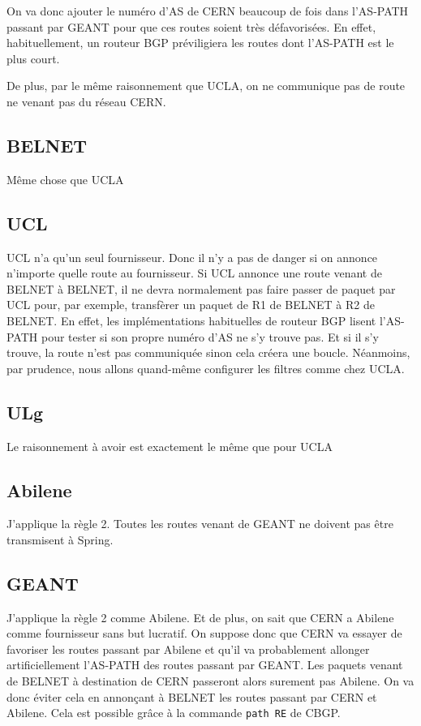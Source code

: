 \documentclass[a4paper, 12pt]{report}
\begin{document}
On va donc ajouter le numéro d'AS de CERN beaucoup de fois dans l'AS-PATH passant par GEANT pour que ces routes soient très défavorisées.
En effet, habituellement, un routeur BGP préviligiera les routes dont l'AS-PATH est le plus court. 

De plus, par le même raisonnement que UCLA, on ne communique pas de route ne venant pas du réseau CERN.

\subsection{BELNET}
Même chose que UCLA

\subsection{UCL}
UCL n'a qu'un seul fournisseur. Donc il n'y a pas de danger si on annonce n'importe quelle route au fournisseur.
Si UCL annonce une route venant de BELNET à BELNET, il ne devra normalement pas faire passer de paquet par UCL pour, par exemple, transfèrer un paquet de R1 de BELNET à R2 de BELNET.
En effet, les implémentations habituelles de routeur BGP lisent l'AS-PATH pour tester si son propre numéro d'AS ne s'y trouve pas.
Et si il s'y trouve, la route n'est pas communiquée sinon cela créera une boucle.
Néanmoins, par prudence, nous allons quand-même configurer les filtres comme chez UCLA.

\subsection{ULg}
Le raisonnement à avoir est exactement le même que pour UCLA

\subsection{Abilene}
J'applique la règle 2. Toutes les routes venant de GEANT ne doivent pas être transmisent à Spring.

\subsection{GEANT}
J'applique la règle 2 comme Abilene.
Et de plus, on sait que CERN a Abilene comme fournisseur sans but lucratif.
On suppose donc que CERN va essayer de favoriser les routes passant par Abilene et qu'il va probablement allonger artificiellement l'AS-PATH des routes passant par GEANT.
Les paquets venant de BELNET à destination de CERN passeront alors surement pas Abilene.
On va donc éviter cela en annonçant à BELNET les routes passant par CERN et Abilene.
Cela est possible grâce à la commande \texttt{path RE} de CBGP.
\end{document}
